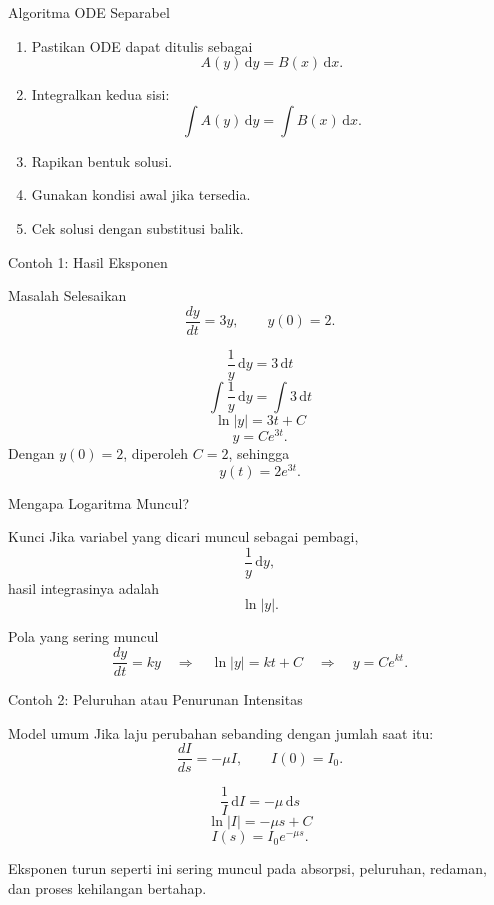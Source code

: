 \documentclass[aspectratio=169,11pt]{beamer}
\newcommand{\dd}{\,\mathrm{d}}
\begin{document}
\begin{frame}{Algoritma ODE Separabel}
\begin{enumerate}
  \item Pastikan ODE dapat ditulis sebagai
  \[
  A(y)\dd y = B(x)\dd x.
  \]
  \item Integralkan kedua sisi:
  \[
  \int A(y)\dd y=\int B(x)\dd x.
  \]
  \item Rapikan bentuk solusi.
  \item Gunakan kondisi awal jika tersedia.
  \item Cek solusi dengan substitusi balik.
\end{enumerate}
\end{frame}

\begin{frame}{Contoh 1: Hasil Eksponen}
\begin{exampleblock}{Masalah}
Selesaikan
\[
\frac{dy}{dt}=3y, \qquad y(0)=2.
\]
\end{exampleblock}
\pause
\[
\frac{1}{y}\dd y=3\dd t
\]
\[
\int \frac{1}{y}\dd y=\int 3\dd t
\]
\[
\ln|y|=3t+C
\]
\[
 y=Ce^{3t}.
\]
Dengan $y(0)=2$, diperoleh $C=2$, sehingga
\[
\boxed{y(t)=2e^{3t}.}
\]
\end{frame}

\begin{frame}{Mengapa Logaritma Muncul?}
\begin{block}{Kunci}
Jika variabel yang dicari muncul sebagai pembagi,
\[
\frac{1}{y}\dd y,
\]
hasil integrasinya adalah
\[
\ln|y|.
\]
\end{block}
\begin{exampleblock}{Pola yang sering muncul}
\[
\frac{dy}{dt}=ky
\quad \Rightarrow \quad
\ln|y|=kt+C
\quad \Rightarrow \quad
 y=Ce^{kt}.
\]
\end{exampleblock}
\end{frame}

\begin{frame}{Contoh 2: Peluruhan atau Penurunan Intensitas}
\begin{exampleblock}{Model umum}
Jika laju perubahan sebanding dengan jumlah saat itu:
\[
\frac{dI}{ds}=-\mu I, \qquad I(0)=I_0.
\]
\end{exampleblock}
\[
\frac{1}{I}\dd I=-\mu\dd s
\]
\[
\ln|I|=-\mu s+C
\]
\[
\boxed{I(s)=I_0e^{-\mu s}.}
\]
\vspace{-0.1cm}
\begin{center}
Eksponen turun seperti ini sering muncul pada absorpsi, peluruhan, redaman, dan proses kehilangan bertahap.
\end{center}
\end{frame}
\end{document}
